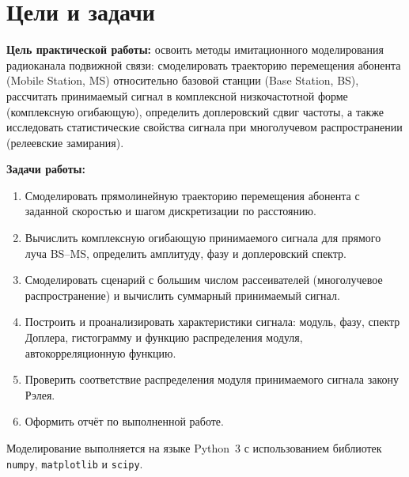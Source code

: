 \chapter*{Цели и задачи}
\label{ch:intro_radio}

\textbf{Цель практической работы:} освоить методы имитационного моделирования
радиоканала подвижной связи: смоделировать траекторию перемещения абонента
(Mobile Station, MS) относительно базовой станции (Base Station, BS),
рассчитать принимаемый сигнал в комплексной низкочастотной форме
(комплексную огибающую), определить доплеровский сдвиг частоты, а также
исследовать статистические свойства сигнала при многолучевом распространении
(релеевские замирания).

\textbf{Задачи работы:}
\begin{enumerate}
    \item Смоделировать прямолинейную траекторию перемещения абонента
          с заданной скоростью и шагом дискретизации по расстоянию.
    \item Вычислить комплексную огибающую принимаемого сигнала для прямого
          луча BS--MS, определить амплитуду, фазу и доплеровский спектр.
    \item Смоделировать сценарий с большим числом рассеивателей
          (многолучевое распространение) и вычислить суммарный принимаемый
          сигнал.
    \item Построить и проанализировать характеристики сигнала: модуль, фазу,
          спектр Доплера, гистограмму и функцию распределения модуля,
          автокорреляционную функцию.
    \item Проверить соответствие распределения модуля принимаемого сигнала
          закону Рэлея.
    \item Оформить отчёт по выполненной работе.
\end{enumerate}

Моделирование выполняется на языке Python~3 с использованием библиотек
\texttt{numpy}, \texttt{matplotlib} и \texttt{scipy}.

\endinput